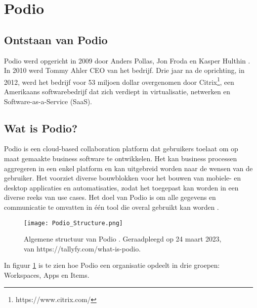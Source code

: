 \section{Podio}
\label{sec:podio}

\subsection{Ontstaan van Podio}
\label{subsec:ontstaan_podio}

Podio werd opgericht in 2009 door Anders Pollas, Jon Froda en Kasper Hulthin \autocite{Crunchbase}. In 2010 werd Tommy Ahler CEO van het bedrijf. Drie jaar na de oprichting, in 2012, werd het bedrijf voor 53 miljoen dollar overgenomen door Citrix\footnote{https://www.citrix.com/}, een Amerikaans softwarebedrijf dat zich verdiept in virtualisatie, netwerken en Software-as-a-Service (SaaS). \\

\subsection{Wat is Podio?}
\label{subsec:wat_is_podio}

Podio is een cloud-based collaboration platform dat gebruikers toelaat om op maat gemaakte business software te ontwikkelen. Het kan business processen aggregeren in een enkel platform en kan uitgebreid worden naar de wensen van de gebruiker. Het voorziet diverse bouwblokken voor het bouwen van mobiele- en desktop applicaties en automatisaties, zodat het toegepast kan worden in een diverse reeks van use cases. Het doel van Podio is om alle gegevens en communicatie te omvatten in één tool die overal gebruikt kan worden \autocite{Podio}. \\ 

\begin{figure}[ht]
    \centering
    \texttt{[image: Podio\_Structure.png]}
    \caption{Algemene structuur van Podio \autocite{TallyfyPodio}. Geraadpleegd op 24 maart 2023, van https://tallyfy.com/what-is-podio.}
    \label{fig:podio_structure}
\end{figure}

In figuur \ref{fig:podio_structure} is te zien hoe Podio een organisatie opdeelt in drie groepen: Workspaces, Apps en Items. \\

